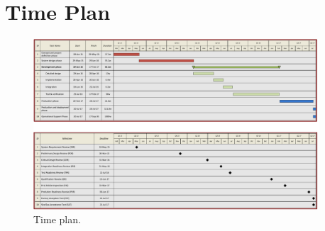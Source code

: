 \chapter{Time Plan}

\begin{figure}[H]
\centering
\includegraphics[width=0.95\textwidth]
{Billeder/Tidsplan_systematic_v2_0.pdf}
\caption{Time plan.}
\label{fig:WBS}
\end{figure}